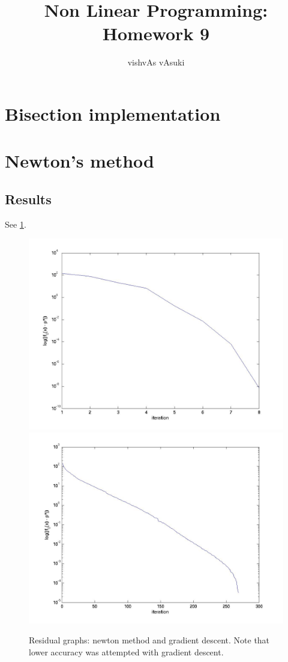 \documentclass{article}
\title{Non Linear Programming: Homework 9}
\author{vishvAs vAsuki}
\begin{document}
\maketitle
\section{Bisection implementation}
\tbc

\section{Newton's method}
\subsection{Results}
See \ref{fig:results}.

\begin{figure}
\includegraphics[scale=0.25]{code/residualNewton.jpg}
\includegraphics[scale=0.25]{code/residualGradientDescent.jpg}
\label{fig:results}
\caption{Residual graphs: newton method and gradient descent. Note that lower accuracy was attempted with gradient descent.}
\end{figure}
\end{document}

